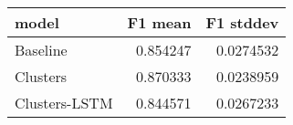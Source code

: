 \begin{tabular}{lrr}
\toprule
 model         &   F1 mean &   F1 stddev \\
\midrule
 Baseline      &  0.854247 &   0.0274532 \\
 Clusters      &  0.870333 &   0.0238959 \\
 Clusters-LSTM &  0.844571 &   0.0267233 \\
\bottomrule
\end{tabular}